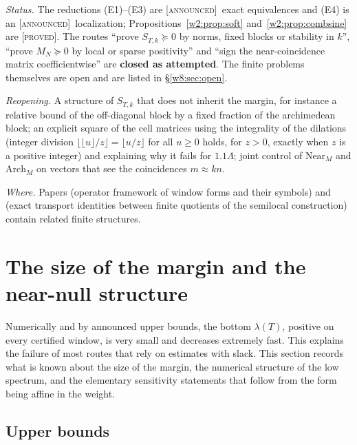 \documentclass[11pt]{amsart}
\theoremstyle{definition}
\theoremstyle{remark}
\numberwithin{equation}{section}
\newcommand{\lam}{\lambda(T)}                          %
\newcommand{\stag}[1]{\textsc{[#1]}}
\newcommand{\PROVED}{\stag{proved}}
\newcommand{\ANNOUNCED}{\stag{announced}}
\newcommand{\rtag}[1]{\textbf{\small\textsf{#1}}}
\newcommand{\closedA}{\rtag{closed as attempted}}
\newcommand{\entry}[1]{\par\smallskip\noindent\textit{#1.}\enspace}
\begin{document}
\entry{Status} The reductions (E1)--(E3) are \ANNOUNCED\ exact equivalences and (E4) is an \ANNOUNCED\ localization; Propositions~\ref{w2:prop:soft}
and~\ref{w2:prop:combsine} are \PROVED. The routes ``prove $S_{T,k}\succeq0$ by norms, fixed blocks or stability in
$k$'', ``prove $M_N\succeq0$ by local or sparse positivity'' and ``sign the near-coincidence matrix coefficientwise''
are \closedA. The finite problems themselves are open and are listed in \S\ref{w8:sec:open}.

\entry{Reopening} A structure of $S_{T,k}$ that does not inherit the margin, for instance a relative bound of the
off-diagonal block by a fixed fraction of the archimedean block; an explicit square of the cell matrices using the
integrality of the dilations (integer division $\lfloor\lfloor u\rfloor/z\rfloor=\lfloor u/z\rfloor$ for all $u\ge0$ holds,
for $z>0$, exactly when $z$ is a positive integer) and explaining why it fails for $1.1\Lambda$; joint control of $\mathrm{Near}_M$ and
$\mathrm{Arch}_M$ on vectors that see the coincidences $m\approx kn$.

\entry{Where} Papers \cite{P26} (operator framework of window forms and their symbols) and \cite{P39} (exact transport
identities between finite quotients of the semilocal construction) contain related finite structures.


\section{The size of the margin and the near-null structure}\label{w2:sec:margin}

Numerically and by announced upper bounds, the bottom $\lam$, positive on every certified window, is very small and decreases extremely fast.
This explains the failure of most routes that rely on estimates with slack. This section records what is
known about the size of the margin, the numerical structure of the low spectrum, and the elementary sensitivity
statements that follow from the form being affine in the weight.

\subsection{Upper bounds}
\end{document}
